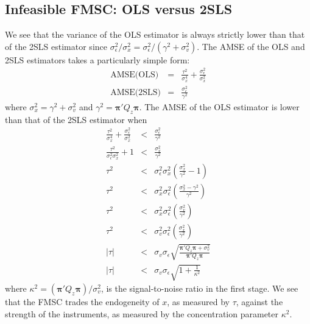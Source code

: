 \documentclass[12pt]{article}
\theoremstyle{definition}
\begin{document}
\subsection{Infeasible FMSC: OLS versus 2SLS}
We see that the variance of the OLS estimator is always strictly lower than that of the 2SLS estimator since $\sigma^2_\epsilon/\sigma_x^2 = \sigma^2_\epsilon/(\gamma^2 + \sigma_v^2)$. The AMSE of the OLS and 2SLS estimators takes a particularly simple form:
  \begin{eqnarray}
  \mbox{AMSE(OLS)} &=& \frac{\tau^2}{\sigma_x^4} + \frac{\sigma_\epsilon^2}{\sigma_x^2}\\
  \mbox{AMSE(2SLS)} &=& \frac{\sigma_\epsilon^2}{\gamma^2}
  \end{eqnarray}
where $\sigma_x^2 = \gamma^2 + \sigma_v^2$ and $\gamma^2 = \boldsymbol{\pi}'Q_z \boldsymbol{\pi}$. The AMSE of the OLS estimator is lower than that of the 2SLS estimator when
  \begin{eqnarray*}
    \frac{\tau^2}{\sigma_x^4} + \frac{\sigma_\epsilon^2}{\sigma_x^2} &<& \frac{\sigma_\epsilon^2}{\gamma^2}\\
    \frac{\tau^2}{\sigma_\epsilon^2\sigma_x^2} + 1&<&\frac{\sigma_x^2}{\gamma^2}\\
    \tau^2 &<&\sigma_\epsilon^2\sigma_x^2\left(\frac{\sigma_x^2}{\gamma^2} - 1\right)\\
        \tau^2  &<& \sigma_x^2 \sigma_\epsilon^2\left(\frac{\sigma_x^2 - \gamma^2}{\gamma^2}\right)\\
        \tau^2  &<& \sigma_x^2 \sigma_\epsilon^2\left(\frac{\sigma_v^2}{\gamma^2}\right)\\
                \tau^2  &<& \sigma_v^2 \sigma_\epsilon^2\left(\frac{\sigma_x^2}{\gamma^2}\right)\\
              |\tau|  &<& \sigma_v \sigma_\epsilon\sqrt{\frac{\boldsymbol{\pi}'Q_z \boldsymbol{\pi} + \sigma_v^2}{\boldsymbol{\pi}'Q_z \boldsymbol{\pi}}}\\
              |\tau|  &<& \sigma_v \sigma_\epsilon \sqrt{1+ \frac{1}{\kappa^2}}
  \end{eqnarray*}
where $\kappa^2 = (\boldsymbol{\pi}'Q_z \boldsymbol{\pi})/\sigma_v^2$, is the signal-to-noise ratio in the first stage. We see that the FMSC trades the endogeneity of $x$, as measured by $\tau$, against the strength of the instruments, as measured by the concentration parameter $\kappa^2$. 
\end{document}

